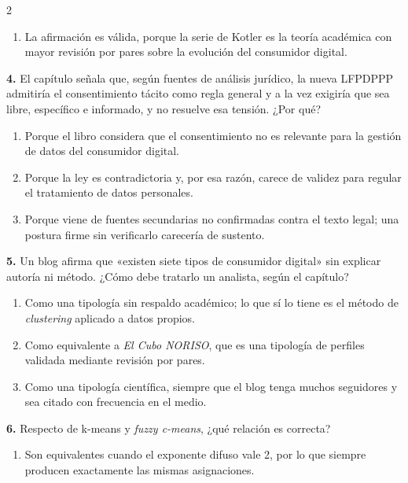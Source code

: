\documentclass[10pt,letterpaper]{article}
\begin{document}
\begin{multicols}{2}
\begin{enumerate}[label=\alph*),leftmargin=1.1em,itemsep=0pt,topsep=1pt,parsep=0pt,partopsep=0pt]
\item La afirmación es válida, porque la serie de Kotler es la teoría académica con mayor revisión por pares sobre la evolución del consumidor digital.
\end{enumerate}
\vspace{2pt}
\noindent\textbf{4.} El capítulo señala que, según fuentes de análisis jurídico, la nueva LFPDPPP admitiría el consentimiento tácito como regla general y a la vez exigiría que sea libre, específico e informado, y no resuelve esa tensión. ¿Por qué?
\vspace{-3pt}
\begin{enumerate}[label=\alph*),leftmargin=1.1em,itemsep=0pt,topsep=1pt,parsep=0pt,partopsep=0pt]
\item Porque el libro considera que el consentimiento no es relevante para la gestión de datos del consumidor digital.
\item Porque la ley es contradictoria y, por esa razón, carece de validez para regular el tratamiento de datos personales.
\item Porque viene de fuentes secundarias no confirmadas contra el texto legal; una postura firme sin verificarlo carecería de sustento.
\end{enumerate}
\vspace{2pt}
\noindent\textbf{5.} Un blog afirma que «existen siete tipos de consumidor digital» sin explicar autoría ni método. ¿Cómo debe tratarlo un analista, según el capítulo?
\vspace{-3pt}
\begin{enumerate}[label=\alph*),leftmargin=1.1em,itemsep=0pt,topsep=1pt,parsep=0pt,partopsep=0pt]
\item Como una tipología sin respaldo académico; lo que sí lo tiene es el método de \textit{clustering} aplicado a datos propios.
\item Como equivalente a \textit{El Cubo NORISO}, que es una tipología de perfiles validada mediante revisión por pares.
\item Como una tipología científica, siempre que el blog tenga muchos seguidores y sea citado con frecuencia en el medio.
\end{enumerate}
\vspace{2pt}
\noindent\textbf{6.} Respecto de k-means y \textit{fuzzy c-means}, ¿qué relación es correcta?
\vspace{-3pt}
\begin{enumerate}[label=\alph*),leftmargin=1.1em,itemsep=0pt,topsep=1pt,parsep=0pt,partopsep=0pt]
\item Son equivalentes cuando el exponente difuso vale 2, por lo que siempre producen exactamente las mismas asignaciones.

\end{enumerate}
\end{multicols}
\end{document}
